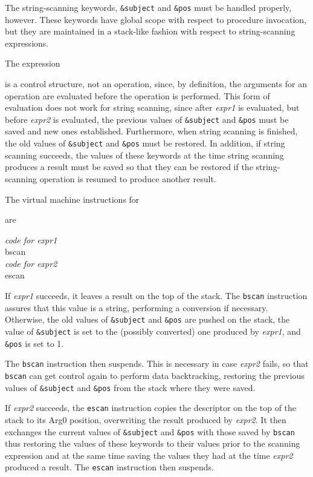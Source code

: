 The string-scanning keywords, \texttt{\&subject} and \texttt{\&pos}
must be handled properly, however. These keywords have global scope
with respect to procedure invocation, but they are maintained in a
stack-like fashion with respect to string-scanning expressions.

The expression


\noindent is a control structure, not an operation, since, by
definition, the arguments for an operation are evaluated before the
operation is performed. This form of evaluation does not work for
string scanning, since after \textit{expr1} is evaluated, but before
\textit{expr2} is evaluated, the previous values of \texttt{\&subject}
and \texttt{\&pos} must be saved and new ones
established. Furthermore, when string scanning is finished, the old
values of \texttt{\&subject} and \texttt{\&pos} must be restored. In
addition, if string scanning succeeds, the values of these keywords at
the time string scanning produces a result must be saved so that they
can be restored if the string-scanning operation is resumed to produce
another result.

The virtual machine instructions for


are
\begin{iconcode}
\>\textit{code for expr1}\\
\>bscan\\
\>\textit{code for expr2}\\
\>escan
\end{iconcode}


If \textit{expr1} succeeds, it leaves a result on the top of the
stack. The \texttt{bscan} instruction assures that this value is a
string, performing a conversion if necessary. Otherwise, the old
values of \texttt{\&subject} and \texttt{\&pos} are pushed on the
stack, the value of \texttt{\&subject} is set to the (possibly
converted) one produced by \textit{expr1}, and \texttt{\&pos} is set
to 1.


The \texttt{bscan} instruction then suspends. This is necessary in
case \textit{expr2} fails, so that \texttt{bscan} can get control
again to perform data backtracking, restoring the previous values of
\texttt{\&subject} and \texttt{\&pos} from the stack where they were
saved.


If \textit{expr2} succeeds, the \texttt{escan} instruction copies the
descriptor on the top of the stack to its Arg0 position, overwriting
the result produced by \textit{expr2}. It then exchanges the current
values of \texttt{\&subject} and \texttt{\&pos} with those saved by
\texttt{bscan} thus restoring the values of these keywords to their
values prior to the scanning expression and at the same time saving
the values they had at the time \textit{expr2} produced a result. The
\texttt{escan} instruction then suspends.

